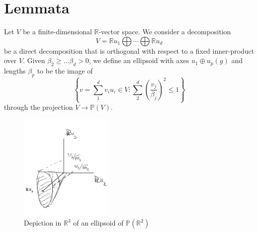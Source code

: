 \documentclass{report}
\begin{document}
\section{Lemmata}
\begin{definition}
    Let $V$ be a finite-dimensional $\mathbb R$-vector space.
    We consider a decomposition
    \[
        V = \mathbb R u_1 \bigoplus \cdots \bigoplus \mathbb R u_d
    \] 
    be a direct decomposition that is orthogonal with respect to a fixed inner-product over $V$.
    Given $\beta_2 \geq \ldots \beta_d > 0$, we define an ellipsoid with axes $u_1 \oplus u_p(g)$ and lengths $\beta_p$ to be the image of
    \[
        \left\{
            v = \sum_1^d v_i u_i\in V : \sum_2^d \left( \frac{v_j}{\beta_j} \right)^2 \leq 1
        \right\}
    \]
    through the projection $ V \to \mathbb P (V)$.
\end{definition}
\begin{figure}[h]
    \centering
    \includegraphics[width=0.4\textwidth]{ellipsoid.jpg}
    \caption{Depiction in $\mathbb R^3$ of an ellipsoid of $\mathbb P(\mathbb R^2)$}
    \label{fig:ellipsoid}
\end{figure}    
\end{document}
